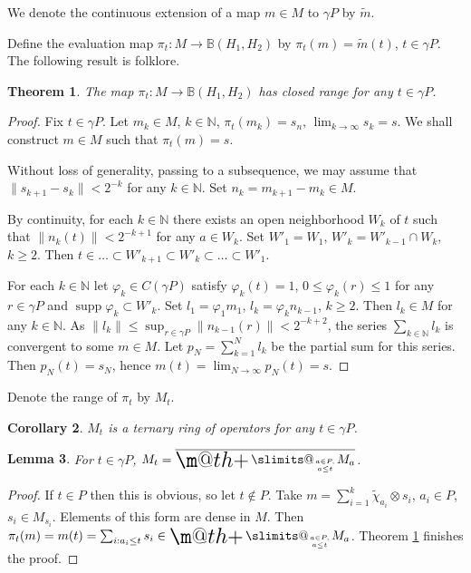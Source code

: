 \documentclass[12pt]{amsart}
\makeatletter
\newtheorem{thm}{Theorem}[section]
\newtheorem{lem}[thm]{Lemma}
\newtheorem{cor}[thm]{Corollary}
\theoremstyle{definition}
\newcommand{\til}{\widetilde}
\newcommand{\supp}{\operatorname{supp}}
\newcommand*\@bigplus[1]{\vcenter{\hbox{#1$\m@th +$}}}
\newcommand*\bigplus{%
    \DOTSB %
    \mathop{%
        \mathchoice
            {\@bigplus \huge}%
            {\@bigplus \LARGE}%
            {\@bigplus {}}%
            {\@bigplus \footnotesize}%
    }%
    \slimits@ %
}
\makeatother
\begin{document}

We denote the continuous extension of a map $m\in M$ to $\gamma P$ by $\til m$.

Define the evaluation map $\pi_t:M\to \mathbb B(H_1,H_2)$ by $\pi_t(m)=\til m(t)$, $t\in \gamma P$. The following result is folklore.

\begin{thm}\label{surj}
The map $\pi_t:M\to\mathbb B(H_1,H_2)$ has closed range for any $t\in\gamma P$.

\end{thm}
\begin{proof}
Fix $t\in\gamma P$.
Let $m_k\in M$, $k\in\mathbb N$, $\pi_t(m_k)=s_n$, $\lim_{k\to\infty}s_k=s$. We shall construct $m\in M$ such that $\pi_t(m)=s$.

Without loss of generality, passing to a subsequence, we may assume that $\|s_{k+1}-s_k\|<2^{-k}$ for any $k\in\mathbb N$. Set $n_k=m_{k+1}-m_k\in M$.

By continuity, for each $k\in\mathbb N$ there exists an open neighborhood $W_k$ of $t$ such that $\|n_k(t)\|<2^{-k+1}$ for any $a\in W_k$.
Set $W'_1=W_1$, $W'_k=W'_{k-1}\cap W_k$, $k\geq 2$. Then $t\in\ldots\subset W'_{k+1}\subset W'_k\subset\ldots\subset W'_1$. 

For each $k\in\mathbb N$ let $\varphi_k\in C(\gamma P)$ satisfy $\varphi_k(t)=1$, $0\leq \varphi_k(r)\leq 1$ for any $r\in\gamma P$ and $\supp\varphi_k\subset W'_k$.
Set $l_1=\varphi_1 m_1$, $l_k=\varphi_k n_{k-1}$, $k\geq 2$. Then $l_k\in M$ for any $k\in\mathbb N$. As $\|l_k\|\leq\sup_{r\in\gamma P}\|n_{k-1}(r)\|<2^{-k+2}$, the series $\sum_{k\in\mathbb N}l_k$ is convergent to some $m\in M$. Let $p_N=\sum_{k=1}^N l_k$ be the partial sum for this series. Then $p_N(t)=s_N$, hence $m(t)=\lim_{N\to\infty}p_N(t)=s$. 
\end{proof}  

Denote the range of $\pi_t$ by $M_t$.

\begin{cor}
$M_t$ is a ternary ring of operators for any $t\in\gamma P$.

\end{cor}

\begin{lem}
For $t\in\gamma P$, $M_t=\overline{\bigplus_{{a\in P,}\atop{a\leq t}}M_a}$.

\end{lem}
\begin{proof}
If $t\in P$ then this is obvious, so let $t\notin P$. Take $m=\sum_{i=1}^k \til\chi_{a_i}\otimes s_i$, $a_i\in P$, $s_i\in M_{s_i}$.  Elements of this form are dense in $M$. Then $\pi_t(m)=m(t)=\sum_{i:a_i\leq t}s_i\in\bigplus_{{a\in P,}\atop{a\leq t}}M_a$. Theorem \ref{surj} finishes the proof.
\end{proof}
\end{document}
